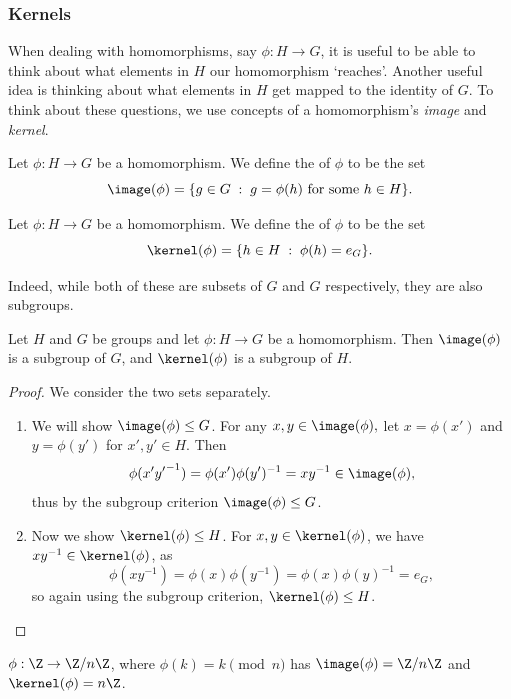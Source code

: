 \documentclass[a4paper]{scrartcl}
\newcommand{\newsubsection}{\subsubsection}
\begin{document}
\newsubsection{Kernels}

When dealing with homomorphisms, say $\phi : H \rightarrow G$, it is useful to be able to think about what elements in $H$ our homomorphism `reaches'.
Another useful idea is thinking about what elements in $H$ get mapped to the identity of $G$. To think about these questions, we use concepts of a homomorphism's \emph{image} and \emph{kernel}. 

\begin{definition}[Image]
	Let $\phi :H \rightarrow G$ be a homomorphism. We define the  of $\phi$ to be the set
	$$
	\image(\phi) = \{ g \in G \; : \; g = \phi(h) \text{ for some } h \in H  \}.
	$$
\end{definition}
\begin{definition}[Kernel]
	Let $\phi : H \rightarrow G$ be a homomorphism. We define the  of $\phi$ to be the set
	$$
	\kernel(\phi) = \{ h \in H \; : \; \phi(h) = e_G \}.
	$$
\end{definition}

Indeed, while both of these are subsets of $G$ and $G$ respectively, they are also subgroups.

\begin{proposition}
	Let $H$ and $G$ be groups and let $\phi : H \rightarrow G$ be a homomorphism. Then $\image(\phi)$ is a subgroup of $G$, and $\kernel(\phi)$ is a subgroup of $H$.
\end{proposition}
\begin{proof}
	We consider the two sets separately.
	\begin{enumerate}
		\item We will show $\image(\phi) \leq G$. For any $x, y \in \image(\phi),$ let $x = \phi(x')$ and $y = \phi(y')$ for $x', y' \in H$. Then
		$$
		\phi(x' {y'}^{-1}) = \phi(x')\phi(y')^{-1} = x y^{-1} \in \image(\phi),
		$$
		thus by the subgroup criterion $\image(\phi) \leq G$.
		\item Now we show $\kernel(\phi) \leq H$. For $x, y \in \kernel(\phi)$, we have $xy^{-1} \in \kernel(\phi)$, as 
		$$
		\phi(xy^{-1}) = \phi(x)\phi(y^{-1}) = \phi(x)\phi(y)^{-1} = e_G,
		$$
		so again using the subgroup criterion, $\kernel(\phi) \leq H$. 
	\end{enumerate}
\end{proof}

\begin{example}
	$\phi : \Z \rightarrow \Z/n\Z$, where $\phi(k) = k \pmod{n}$ has $\image(\phi) = \Z/n\Z$ and $\kernel(\phi) = n\Z$.
\end{example}
\end{document}
